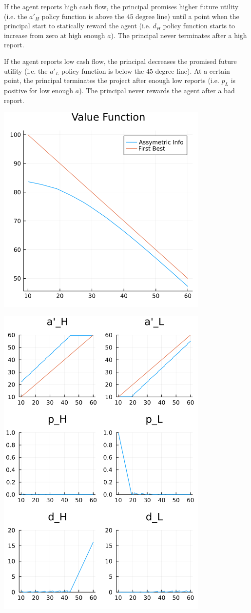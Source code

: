 \documentclass{article}
\begin{document}
\bigskip

If the agent reports high cash flow, the principal promises higher future utility (i.e. the $a'_H$ policy function is above the 45 degree line) until a point when the principal start to statically reward the agent (i.e. $d_H$ policy function starts to increase from zero at high enough $a$).  The principal never terminates after a high report.

\bigskip

If the agent reports low cash flow, the principal decreases the promised future utility (i.e. the $a'_L$ policy function is below the 45 degree line). At a certain point, the principal terminates the project after enough low reports (i.e. $p_L$ is positive for low enough $a$).  The principal never rewards the agent after a bad report.

\includegraphics{value_function.png}



\includegraphics{policy_functions.png}
\end{document}
